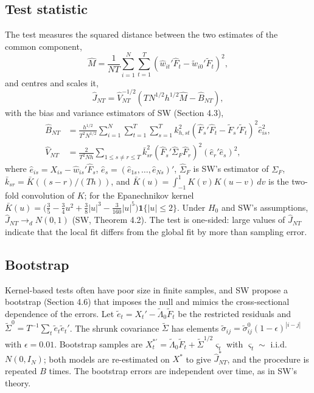 \documentclass[11pt]{article}
\begin{document}
\subsection{Test statistic}

The test measures the squared distance between the two estimates of the common component,
\begin{equation}\label{eq.M}
  \hat M=\frac{1}{NT}\sum_{i=1}^{N}\sum_{t=1}^{T}\left(\hat w_{it}'\hat F_t-\tilde w_{i0}'\tilde F_t\right)^2,
\end{equation}
and centres and scales it,
\begin{equation}\label{eq.J}
  \hat J_{NT}=\hat V_{NT}^{-1/2}\left(TN^{1/2}h^{1/2}\hat M-\hat B_{NT}\right),
\end{equation}
with the bias and variance estimators of SW (Section 4.3),
\begin{align*}
  \hat B_{NT}&=\frac{h^{1/2}}{T^2N^{1/2}}\sum_{i=1}^{N}\sum_{t=1}^{T}\sum_{s=1}^{T}k_{h,st}^2\left(\hat F_s'\hat F_t-\tilde F_s'\tilde F_t\right)^2\hat e_{is}^2,\\
  \hat V_{NT}&=\frac{2}{T^2Nh}\sum_{1\le s\ne r\le T}\bar k_{sr}^2\left(\hat F_s'\hat\Sigma_F\hat F_r\right)^2\left(\hat e_r'\hat e_s\right)^2,
\end{align*}
where $\hat e_{is}=X_{is}-\hat w_{is}'\hat F_s$, $\hat e_s=(\hat e_{1s},\ldots,\hat e_{Ns})'$, $\hat\Sigma_F$ is SW's estimator of $\Sigma_F$, $\bar k_{sr}=\bar K((s-r)/(Th))$, and $\bar K(u)=\int_{-1}^1K(v)K(u-v)\,dv$ is the two-fold convolution of $K$; for the Epanechnikov kernel $\bar K(u)=\big(\tfrac35-\tfrac34u^2+\tfrac38|u|^3-\tfrac{3}{160}|u|^5\big)\mathbf 1\{|u|\le2\}$. Under $H_0$ and SW's assumptions, $\hat J_{NT}\to_d N(0,1)$ (SW, Theorem 4.2). The test is one-sided: large values of $\hat J_{NT}$ indicate that the local fit differs from the global fit by more than sampling error.

\subsection{Bootstrap}

Kernel-based tests often have poor size in finite samples, and SW propose a bootstrap (Section 4.6) that imposes the null and mimics the cross-sectional dependence of the errors. Let $\tilde e_t=X_t'-\tilde\Lambda_0\tilde F_t$ be the restricted residuals and $\tilde\Sigma^0=T^{-1}\sum_t\tilde e_t\tilde e_t'$. The shrunk covariance $\tilde\Sigma$ has elements $\tilde\sigma_{ij}=\tilde\sigma^0_{ij}(1-\epsilon)^{|i-j|}$ with $\epsilon=0.01$. Bootstrap samples are $X^{*\prime}_t=\tilde\Lambda_0\tilde F_t+\tilde\Sigma^{1/2}\varsigma_t$ with $\varsigma_t\sim$ i.i.d.\ $N(0,I_N)$; both models are re-estimated on $X^*$ to give $\hat J^*_{NT}$, and the procedure is repeated $B$ times. The bootstrap errors are independent over time, as in SW's theory.
\end{document}
